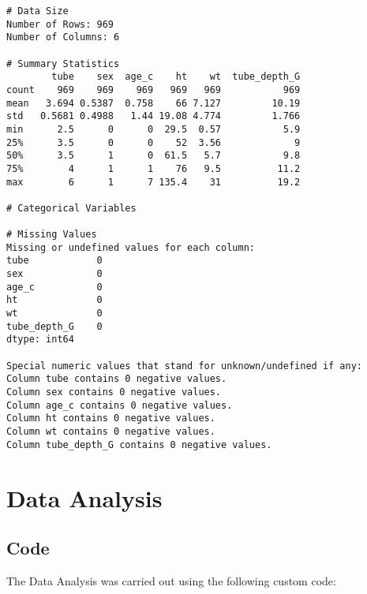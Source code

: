 \documentclass[11pt]{article}
\begin{document}
\begin{Verbatim}[tabsize=4]
# Data Size
Number of Rows: 969
Number of Columns: 6

# Summary Statistics
        tube    sex  age_c    ht    wt  tube_depth_G
count    969    969    969   969   969           969
mean   3.694 0.5387  0.758    66 7.127         10.19
std   0.5681 0.4988   1.44 19.08 4.774         1.766
min      2.5      0      0  29.5  0.57           5.9
25%      3.5      0      0    52  3.56             9
50%      3.5      1      0  61.5   5.7           9.8
75%        4      1      1    76   9.5          11.2
max        6      1      7 135.4    31          19.2

# Categorical Variables

# Missing Values
Missing or undefined values for each column:
tube            0
sex             0
age_c           0
ht              0
wt              0
tube_depth_G    0
dtype: int64

Special numeric values that stand for unknown/undefined if any:
Column tube contains 0 negative values.
Column sex contains 0 negative values.
Column age_c contains 0 negative values.
Column ht contains 0 negative values.
Column wt contains 0 negative values.
Column tube_depth_G contains 0 negative values.

\end{Verbatim}

\section{Data Analysis}
\subsection{{Code}}
The Data Analysis was carried out using the following custom code:
\end{document}
